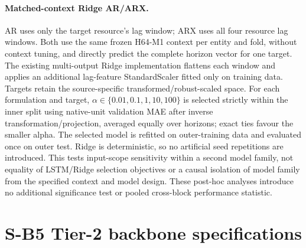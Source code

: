 \documentclass[a4paper,11pt]{article}
\begin{document}
\paragraph{Matched-context Ridge AR/ARX.}
AR uses only the target resource's lag window; ARX uses all four resource lag
windows. Both use the same frozen H64-M1 context per entity and fold, without
context tuning, and directly predict the complete horizon vector for one
target. The existing multi-output Ridge implementation flattens each window
and applies an additional lag-feature StandardScaler fitted only on training
data. Targets retain the source-specific transformed/robust-scaled space.
For each formulation and target, $\alpha\in\{0.01,0.1,1,10,100\}$ is selected
strictly within the inner split using native-unit validation MAE after inverse
transformation/projection, averaged equally over horizons; exact ties favour
the smaller alpha. The selected model is refitted on outer-training data and
evaluated once on outer test. Ridge is deterministic, so no artificial seed
repetitions are introduced. This tests input-scope sensitivity within a
second model family, not equality of LSTM/Ridge selection objectives or a
causal isolation of model family from the specified context and model design.
These post-hoc analyses introduce no additional significance test or pooled
cross-block performance statistic.

\clearpage
\section*{S-B5 Tier-2 backbone specifications}
\end{document}
